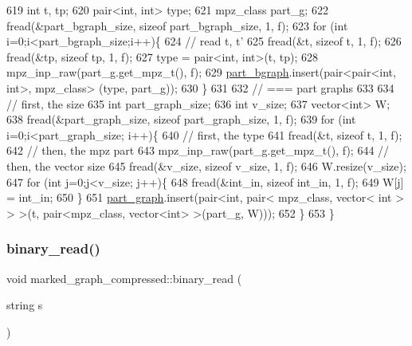 \begin{DoxyCode}
619   \textcolor{keywordtype}{int} t, tp;
620   pair<int, int> type; 
621   mpz\_class part\_g; 
622   fread(&part\_bgraph\_size, \textcolor{keyword}{sizeof} part\_bgraph\_size, 1, f);
623   \textcolor{keywordflow}{for} (\textcolor{keywordtype}{int} i=0;i<part\_bgraph\_size;i++)\{
624     \textcolor{comment}{// read t, t'}
625     fread(&t, \textcolor{keyword}{sizeof} t, 1, f);
626     fread(&tp, \textcolor{keyword}{sizeof} tp, 1, f);
627     type = pair<int, int>(t, tp);
628     mpz\_inp\_raw(part\_g.get\_mpz\_t(), f);
629     \hyperlink{classmarked__graph__compressed_a7b3267063fba30b45eb21b3ba4e07536}{part\_bgraph}.insert(pair<pair<int, int>, mpz\_class> (type, part\_g));
630   \}
631 
632   \textcolor{comment}{// === part graphs}
633 
634   \textcolor{comment}{// first, the size}
635   \textcolor{keywordtype}{int} part\_graph\_size;
636   \textcolor{keywordtype}{int} v\_size;
637   vector<int> W; 
638   fread(&part\_graph\_size, \textcolor{keyword}{sizeof} part\_graph\_size, 1, f);
639   \textcolor{keywordflow}{for} (\textcolor{keywordtype}{int} i=0;i<part\_graph\_size; i++)\{
640     \textcolor{comment}{// first, the type}
641     fread(&t, \textcolor{keyword}{sizeof} t, 1, f);
642     \textcolor{comment}{// then, the mpz part}
643     mpz\_inp\_raw(part\_g.get\_mpz\_t(), f);
644     \textcolor{comment}{// then, the vector size}
645     fread(&v\_size, \textcolor{keyword}{sizeof} v\_size, 1, f);
646     W.resize(v\_size);
647     \textcolor{keywordflow}{for} (\textcolor{keywordtype}{int} j=0;j<v\_size; j++)\{
648       fread(&int\_in, \textcolor{keyword}{sizeof} int\_in, 1, f);
649       W[j] = int\_in;
650     \}
651     \hyperlink{classmarked__graph__compressed_ae179a4737e6eab905c18a94d44ef64b7}{part\_graph}.insert(pair<\textcolor{keywordtype}{int}, pair< mpz\_class, vector< int > > >(t, pair<mpz\_class, vector<int>
       >(part\_g, W)));
652   \}
653 \}
\end{DoxyCode}
\mbox{\label{classmarked__graph__compressed_a01c67fe4234738db6bb60459515c3ad8}} 
\subsubsection{\texorpdfstring{binary\+\_\+read()}{binary\_read()}\hspace{0.1cm}{\footnotesize\ttfamily [2/2]}}
{\footnotesize\ttfamily void marked\+\_\+graph\+\_\+compressed\+::binary\+\_\+read (\begin{DoxyParamCaption}\item[{string}]{s }\end{DoxyParamCaption})}


